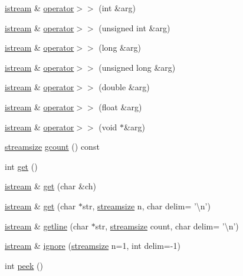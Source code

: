 \begin{DoxyCompactItemize}
\item 
\hyperlink{classistream}{istream} \& \hyperlink{classistream_af31fd460ce65e8dc0929e367335eef71}{operator$>$$>$} (int \&arg)
\item 
\hyperlink{classistream}{istream} \& \hyperlink{classistream_a980edd89025debf8b346a9ea4db86900}{operator$>$$>$} (unsigned int \&arg)
\item 
\hyperlink{classistream}{istream} \& \hyperlink{classistream_aa0ceb042aa3585202ed8e36406da1569}{operator$>$$>$} (long \&arg)
\item 
\hyperlink{classistream}{istream} \& \hyperlink{classistream_a7edb4dc87687c0d544430765f4cdc5f3}{operator$>$$>$} (unsigned long \&arg)
\item 
\hyperlink{classistream}{istream} \& \hyperlink{classistream_aa55a6774a025a01f2f3a4a81932cd78b}{operator$>$$>$} (double \&arg)
\item 
\hyperlink{classistream}{istream} \& \hyperlink{classistream_a5213f1104eb7fe6777a154e3585b0289}{operator$>$$>$} (float \&arg)
\item 
\hyperlink{classistream}{istream} \& \hyperlink{classistream_abcf3035924a67a265f5415b4e23a63db}{operator$>$$>$} (void $\ast$\&arg)
\item 
\hyperlink{classios__base_a4da0480b3f0f665fd27870782a6f7331}{streamsize} \hyperlink{classistream_a07b04ca7418f0fb4f7cf048960ab325f}{gcount} () const 
\item 
int \hyperlink{classistream_a84a9cd93622aa531274dd4c027f006ce}{get} ()
\item 
\hyperlink{classistream}{istream} \& \hyperlink{classistream_a1bb62dd22bb57163065d4e727c82334e}{get} (char \&ch)
\item 
\hyperlink{classistream}{istream} \& \hyperlink{classistream_aed814867694c42c906c1cf928293ed33}{get} (char $\ast$str, \hyperlink{classios__base_a4da0480b3f0f665fd27870782a6f7331}{streamsize} n, char delim= '\textbackslash{}n')
\item 
\hyperlink{classistream}{istream} \& \hyperlink{classistream_acd39b3c2a269a6bd0b35fc663dc2625e}{getline} (char $\ast$str, \hyperlink{classios__base_a4da0480b3f0f665fd27870782a6f7331}{streamsize} count, char delim= '\textbackslash{}n')
\item 
\hyperlink{classistream}{istream} \& \hyperlink{classistream_a574f0c5c368919bd2fcda62696f96293}{ignore} (\hyperlink{classios__base_a4da0480b3f0f665fd27870782a6f7331}{streamsize} n=1, int delim=-\/1)
\item 
int \hyperlink{classistream_a9040fa1d479d71edf3a826f4691c35c4}{peek} ()

\end{DoxyCompactItemize}
